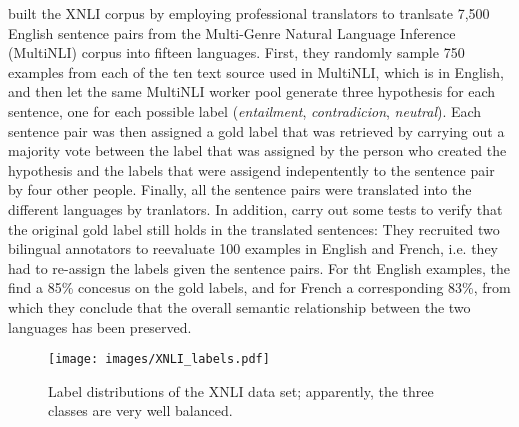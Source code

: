 \cite{conneau2018xnli} built the XNLI corpus by employing professional translators to tranlsate
7,500 English sentence pairs from the Multi-Genre Natural Language Inference (MultiNLI) corpus
\cite{williams2017broad} into fifteen languages.
First, they randomly sample 750 examples from each of the ten text source used in MultiNLI, which
is in English, and then let the same MultiNLI worker pool generate three hypothesis for each
sentence, one for each possible label (\emph{entailment}, \emph{contradicion}, \emph{neutral}).
Each sentence pair was then assigned a gold label that was retrieved by carrying out a majority
vote between the label that was assigned by the person who created the hypothesis and the labels
that were assigend indepentently to the sentence pair by four other people.
Finally, all the sentence pairs were translated into the different languages by tranlators.
In addition, \cite{conneau2018xnli} carry out some tests to verify that the original gold label
still holds in the translated sentences:
They recruited two bilingual annotators to reevaluate 100 examples in English and French, i.e.
they had to re-assign the labels given the sentence pairs.
For tht English examples, the find a 85\% concesus on the gold labels, and for French a
corresponding 83\%, from which they conclude that the overall semantic relationship between the
two languages has been preserved.

\begin{wrapfigure}[16]{r}{0.45\linewidth}
  \begin{center}
    \texttt{[image: images/XNLI\_labels.pdf]}
  \end{center}
  \caption[XNLI labels]{Label distributions of the XNLI data set; apparently, the three classes are very well balanced.}
\end{wrapfigure}

